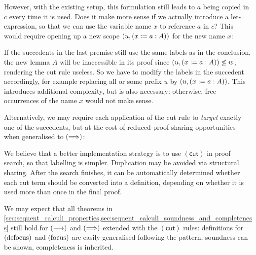 \documentclass[twoside]{report}
\begin{document}
However, with the existing setup, this formulation still leads to $a$ being copied in $c$ every time it is used. Does it make more sense if we actually introduce a let-expression, so that we can use the variable name $x$ to reference $a$ in $c$? This would require opening up a new scope $(u, (x := a : A))$ for the new name $x$:

\begin{prooftree}
\end{prooftree}

If the succedents in the last premise still use the same labels as in the conclusion, the new lemma $A$ will be inaccessible in its proof since $(u, (x := a : A)) \not\leq w$, rendering the cut rule useless. So we have to modify the labels in the succedent accordingly, for example replacing all or some prefix $u$ by $(u, (x := a : A))$. This introduces additional complexity, but is also necessary: otherwise, free occurrences of the name $x$ would not make sense.

Alternatively, we may require each application of the cut rule to \emph{target} exactly one of the succedents, but at the cost of reduced proof-sharing opportunities when generalised to $(\Longrightarrow)$:

\begin{prooftree}
\end{prooftree}

We believe that a better implementation strategy is to use $(\mathsf{cut})$ in proof search, so that labelling is simpler. Duplication may be avoided via structural sharing. After the search finishes, it can be automatically determined whether each cut term should be converted into a definition, depending on whether it is used more than once in the final proof.

We may expect that all theorems in \cref{sec:sequent_calculi_properties,sec:sequent_calculi_soundness_and_completeness} still hold for $(\longrightarrow)$ and $(\Longrightarrow)$ extended with the $(\mathsf{cut})$ rules: definitions for $(\operatorname{defocus})$ and $(\operatorname{focus})$ are easily generalised following the pattern, soundness can be shown, completeness is inherited.
\end{document}
